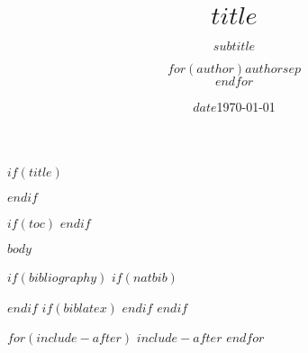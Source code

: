 \documentclass[$for(classoptions)$$classoptions$$sep$,$endfor$]{$documentclass$}
\title{$title$}
\subtitle{$subtitle$}
\author{$for(author)$$author$$sep$ \\ $endfor$}
\date{$date$}
\date{\today}
\begin{document}
$if(title)$
\maketitle
$endif$

$if(toc)$
{\hypersetup{hidelinks}\tableofcontents}
$endif$


$body$

$if(bibliography)$
$if(natbib)$


$endif$
$if(biblatex)$
\printbibliography[heading=bibintoc]
$endif$
$endif$

$for(include-after)$
$include-after$
$endfor$
\end{document}
